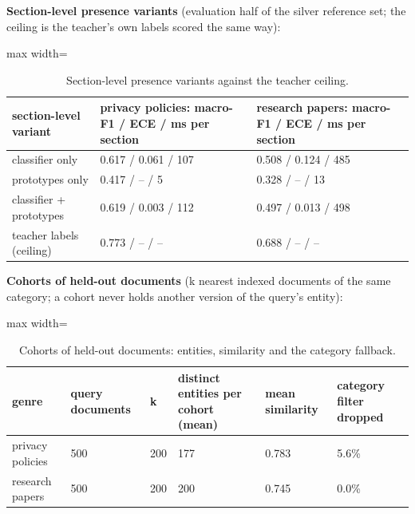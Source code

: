 \documentclass[11pt,a4paper]{article}
\newcommand{\panel}[1]{\par\medskip\noindent #1\par\smallskip}
\begin{document}
\begin{table}[H]
\centering\small
\panel{\textbf{Section-level presence variants} (evaluation half of the silver reference set; the ceiling is the teacher's own labels scored the same way):}
\begin{adjustbox}{max width=\linewidth}
\begin{tabular}{lll}
\toprule
section-level variant & privacy policies: macro-F1 / ECE / ms per section & research papers: macro-F1 / ECE / ms per section \\
\midrule
classifier only & 0.617 / 0.061 / 107 & 0.508 / 0.124 / 485 \\
prototypes only & 0.417 / – / 5 & 0.328 / – / 13 \\
classifier + prototypes & 0.619 / 0.003 / 112 & 0.497 / 0.013 / 498 \\
teacher labels (ceiling) & 0.773 / – / – & 0.688 / – / – \\
\bottomrule
\end{tabular}
\end{adjustbox}
\caption{Section-level presence variants against the teacher ceiling.}
\end{table}

\begin{table}[H]
\centering\small
\panel{\textbf{Cohorts of held-out documents} (k nearest indexed documents of the same category; a cohort never holds another version of the query's entity):}
\begin{adjustbox}{max width=\linewidth}
\begin{tabular}{llllll}
\toprule
genre & query documents & k & distinct entities per cohort (mean) & mean similarity & category filter dropped \\
\midrule
privacy policies & 500 & 200 & 177 & 0.783 & 5.6\% \\
research papers & 500 & 200 & 200 & 0.745 & 0.0\% \\
\bottomrule
\end{tabular}
\end{adjustbox}
\caption{Cohorts of held-out documents: entities, similarity and the category fallback.}
\end{table}
\end{document}
